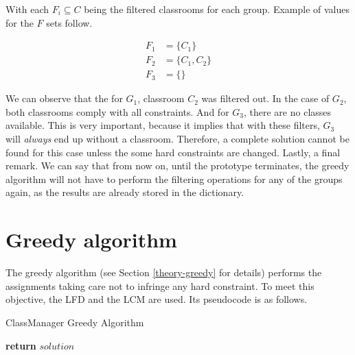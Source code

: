 With each $F_{i} \subseteq C$ being the filtered classrooms for each group. Example of values for the $F$ sets follow.

\begin{align}
    F_{1} &= \{ C_{1} \}\\
    F_{2} &= \{ C_{1}, C_{2} \}\\
    F_{3} &= \{ \}
\end{align}

We can observe that the for $G_{1}$, classroom $C_{2}$ was filtered out. In the case of $G_{2}$, both classrooms comply with all constraints. And for $G_{3}$, there are no classes available. This is very important, because it implies that with these filters, $G_{3}$ will \textit{always} end up without a classroom. Therefore, a complete solution cannot be found for this case unless the some hard constraints are changed. Lastly, a final remark. We can say that from now on, until the prototype terminates, the greedy algorithm will not have to perform the filtering operations for any of the groups again, as the results are already stored in the dictionary. 



\section{Greedy algorithm}

The greedy algorithm (see Section \ref{theory-greedy} for details) performs the assignments taking care not to infringe any hard constraint. To meet this objective, the LFD and the LCM are used. Its pseudocode is as follows.

\begin{algorithm}[H]
    \caption{ClassManager Greedy Algorithm}
    \begin{algorithmic}[1]
                    \Else
                    \EndIf
                \EndIf
            \EndFor
            \State \textbf{return} $solution$
        \EndProcedure
    \end{algorithmic}
\end{algorithm}


